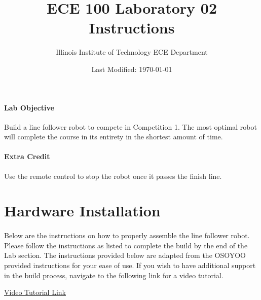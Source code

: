 \documentclass{article}
\title{ECE 100 Laboratory 02 Instructions }
\author{Illinois Institute of Technology ECE Department}
\date{Last Modified: \today}
\begin{document}
	\maketitle
	
	\paragraph{Lab Objective}
	Build a line follower robot to compete in Competition 1. The most optimal robot will complete the course in its entirety in the shortest amount of time.
	
	\paragraph{Extra Credit} Use the remote control to stop the robot once it passes the finish line.
	
	\section{Hardware Installation}
	
	\paragraph{} Below are the instructions on how to properly assemble the line follower robot. Please follow the instructions as listed to complete the build by the end of the Lab section. The instructions provided below are adapted from the OSOYOO provided instructions for your ease of use. If you wish to have additional support in the build process, navigate to the following link for a video tutorial. 
	
	\href{https://osoyoo.com/2020/05/12/osoyoo-v2-1-robot-car-kit-lesson-4-tracking-line-robot-car/}{Video Tutorial Link}
	
\end{document}
